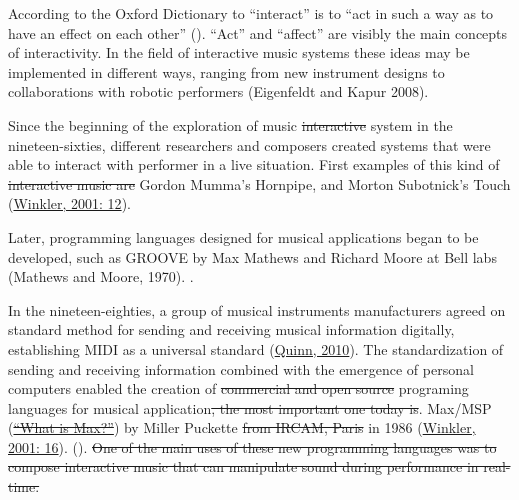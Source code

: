According to the Oxford Dictionary to ``interact'' is to ``act in such a way as to have an effect on each other'' (). ``Act'' and ``affect'' are visibly the main concepts of interactivity. In the field of interactive music systems these ideas may be implemented in different ways, ranging from new instrument designs to collaborations with robotic performers (Eigenfeldt and Kapur 2008).

Since the beginning of the exploration  of  music \st{interactive} system in the nineteen-sixties, different researchers and composers created systems that were able to interact with performer in a live situation. First examples of this kind of \st{interactive music are}   Gordon Mumma's Hornpipe, and Morton Subotnick's Touch (\href{http://blog.lib.umn.edu/geers001/emusic/14_assig_ComposingInteractiveMusicCh1-2.pdf}{Winkler, 2001: 12}).

Later, programming languages designed for musical applications began to be developed, such as GROOVE by Max Mathews and Richard Moore at Bell labs (Mathews and Moore, 1970). .

In the nineteen-eighties, a group of musical instruments manufacturers agreed on standard method for sending and receiving musical information digitally, establishing MIDI  as a universal standard (\href{http://www.insidetechnology360.com/index.php/the-history-of-midi-8862/}{Quinn, 2010}). The standardization of sending and receiving information combined with the emergence of personal computers enabled the creation of \st{commercial and open source}  programing languages for musical application\st{, the most important one today is}. Max/MSP (\href{http://cycling74.com/whatismax/}{\st{``What is Max?''}})  by Miller Puckette \st{from IRCAM, Paris} in 1986  (\href{http://blog.lib.umn.edu/geers001/emusic/14_assig_ComposingInteractiveMusicCh1-2.pdf}{Winkler, 2001: 16}).  ().\st{ One of the main uses of these new programming languages was to compose interactive music that can manipulate sound during performance in real-time.}

